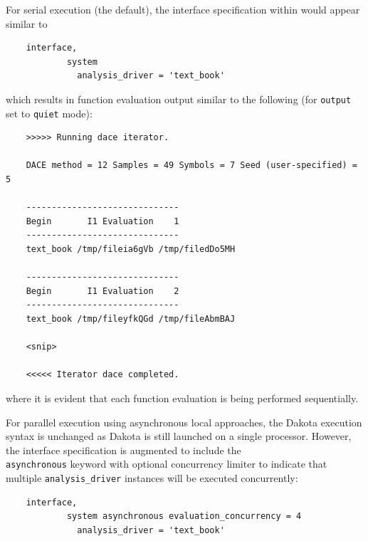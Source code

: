 For serial execution (the default), the interface specification within
 would appear similar to
\begin{small}
\begin{verbatim}
    interface,
            system
              analysis_driver = 'text_book'
\end{verbatim}
\end{small}

which results in function evaluation output similar to the following
(for \texttt{output} set to \texttt{quiet} mode):
\begin{small}
\begin{verbatim}
    >>>>> Running dace iterator.
    
    DACE method = 12 Samples = 49 Symbols = 7 Seed (user-specified) = 5
    
    ------------------------------
    Begin       I1 Evaluation    1
    ------------------------------
    text_book /tmp/fileia6gVb /tmp/filedDo5MH
    
    ------------------------------
    Begin       I1 Evaluation    2
    ------------------------------
    text_book /tmp/fileyfkQGd /tmp/fileAbmBAJ
    
    <snip>
    
    <<<<< Iterator dace completed.
\end{verbatim}
\end{small}
where it is evident that each function evaluation is being performed
sequentially.

For parallel execution using asynchronous local approaches, the Dakota
execution syntax is unchanged as Dakota is still launched on a single
processor.  However, the interface specification is augmented to
include the\\ \texttt{asynchronous} keyword with optional concurrency
limiter to indicate that multiple \texttt{analysis\_driver} instances
will be executed concurrently:
\begin{small}
\begin{verbatim}
    interface,
            system asynchronous evaluation_concurrency = 4
              analysis_driver = 'text_book'
\end{verbatim}
\end{small}

